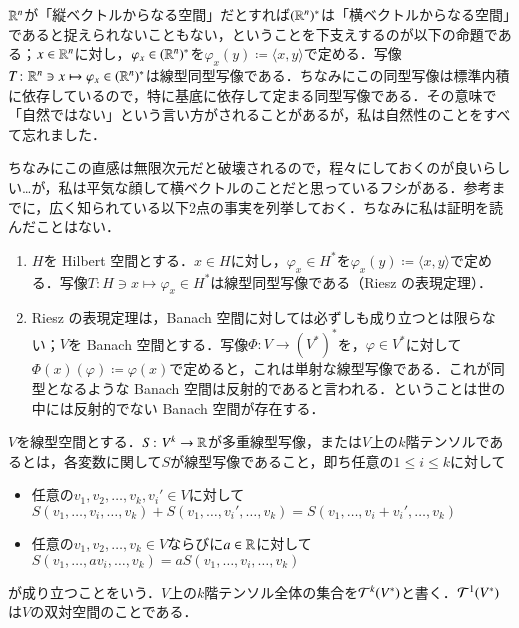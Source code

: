 \begin{que}\label{双対空間は縦ベクトル}
$\mathbb{R}^n$が「縦ベクトルからなる空間」だとすれば$(\mathbb{R}^n)^*$は「横ベクトルからなる空間」であると捉えられないこともない，ということを下支えするのが以下の命題である；$x \in \mathbb{R}^n$に対し，$\varphi_x \in (\mathbb{R}^n)^*$を$\varphi_x(y) \coloneqq \langle x,y \rangle$で定める．写像$T \colon \mathbb{R}^n \ni x \mapsto \varphi_x \in (\mathbb{R}^n)^*$は線型同型写像である．ちなみにこの同型写像は標準内積に依存しているので，特に基底に依存して定まる同型写像である．その意味で「自然ではない」という言い方がされることがあるが，私は自然性のことをすべて忘れました．
\end{que}

\begin{que}[**]
ちなみにこの直感は無限次元だと破壊されるので，程々にしておくのが良いらしい…が，私は平気な顔して横ベクトルのことだと思っているフシがある．参考までに，広く知られている以下2点の事実を列挙しておく．ちなみに私は証明を読んだことはない．
\begin{enumerate}
\item $H$を Hilbert 空間とする．$x \in H$に対し，$\varphi_x \in H^*$を$\varphi_x(y) \coloneqq \langle x,y \rangle$で定める．写像$T \colon H \ni x \mapsto \varphi_x \in H^*$は線型同型写像である（Riesz の表現定理）．
\item Riesz の表現定理は，Banach 空間に対しては必ずしも成り立つとは限らない；$V$を Banach 空間とする．写像$\Phi \colon V \to (V^*)^*$を，$\varphi \in V^*$に対して$\Phi(x)(\varphi) \coloneqq \varphi(x)$で定めると，これは単射な線型写像である．これが同型となるような Banach 空間は反射的であると言われる．ということは世の中には反射的でない Banach 空間が存在する．
\end{enumerate}
\end{que}

\begin{defi}
$V$を線型空間とする．$S \colon V^k \to \mathbb{R}$が多重線型写像，または$V$上の$k$階テンソルであるとは，各変数に関して$S$が線型写像であること，即ち任意の$1 \leq i \leq k$に対して
\begin{itemize}
\item 任意の$v_1, v_2, \dots, v_k, v_i' \in V$に対して$S(v_1, \dots, v_i, \dots, v_k) + S(v_1, \dots, v_i', \dots, v_k) = S(v_1, \dots, v_i + v_i', \dots, v_k)$
\item 任意の$v_1, v_2, \dots, v_k \in V$ならびに$a \in \mathbb{R}$に対して$S(v_1, \dots, av_i, \dots, v_k) = aS(v_1, \dots, v_i, \dots, v_k)$
\end{itemize}が成り立つことをいう．$V$上の$k$階テンソル全体の集合を$\mathcal{T}^k(V^*)$と書く．$\mathcal{T}^1(V^*)$は$V$の双対空間のことである．
\end{defi}

